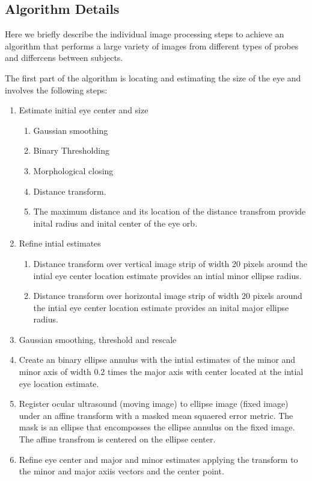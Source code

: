 \documentclass{llncs}
\begin{document}
\subsection{Algorithm Details}
Here we briefly describe the individual image processing steps to achieve an
algorithm that performs a large variety of images from different types of probes
and differcens between subjects.

The first part of the algorithm is locating and estimating the size of the eye
and involves the following steps:
\begin{enumerate}
\item Estimate initial eye center and size
  \begin{enumerate}
  \item Gaussian smoothing
  \item Binary Thresholding
  \item Morphological closing
  \item Distance transform. 
  \item The maximum distance and its location of the distance transfrom provide inital radius
        and inital center of the eye orb. 
  \end{enumerate}
\item Refine intial estimates
  \begin{enumerate}
  \item Distance transform over vertical image strip of width 20 pixels
        around the intial eye center location estimate provides an intial
        minor ellipse radius.
  \item Distance transform over horizontal image strip of width 20 pixels 
        around the intial eye center location estimate provides an inital major
        ellipse radius.
  \end{enumerate}
\item Gaussian smoothing, threshold and rescale
\item Create an binary ellipse annulus with the intial estimates of the minor and
      minor axis of width $0.2$ times the major axis with center located at the
      intial eye location estimate.
\item Register ocular ultrasound (moving image) to ellipse image (fixed image)
      under an affine transform with a masked mean squaered error metric. The
      mask is an ellipse that encomposses the ellipse annulus on the fixed
      image. The affine transfrom is centered on the ellipse center.
\item Refine eye center and major and minor estimates applying the transform to
      the minor and major axiis vectors and the center point.
\end{enumerate}
\end{document}
